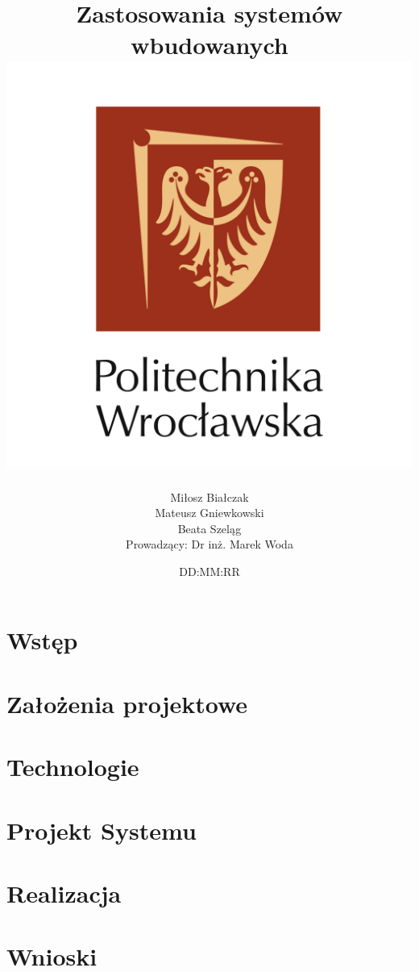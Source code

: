 \documentclass[12pt]{report}
\title{
        {Zastosowania systemów wbudowanych}\\
        {\includegraphics{pwr.png}}
}
\author{
Miłosz Białczak\\
Mateusz Gniewkowski\\
Beata Szeląg\\[15pt]
Prowadzący: Dr inż. Marek Woda
}
\date{DD:MM:RR}
\begin{document}
\maketitle

\tableofcontents

%

\chapter{Wstęp}


\chapter{Założenia projektowe}


\chapter{Technologie}


\chapter{Projekt Systemu}


\chapter{Realizacja}


\chapter{Wnioski}

\end{document}
